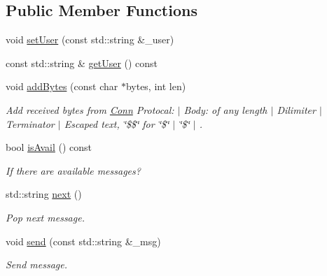 \subsection*{Public Member Functions}
\begin{DoxyCompactItemize}
\item 
void \hyperlink{classContext_a0c72699560699b43eef88c14e3e71943}{set\+User} (const std\+::string \&\+\_\+user)
\item 
const std\+::string \& \hyperlink{classContext_ad6a061c8ed4681e09c25eb830c29d93c}{get\+User} () const 
\item 
void \hyperlink{classContext_a124207fc0f8ef54550ae923503c487c9}{add\+Bytes} (const char $\ast$bytes, int len)
\begin{DoxyCompactList}\small\item\em Add received bytes from \hyperlink{classConn}{Conn} Protocal\+: $\vert$ Body\+: of any length $\vert$ Dilimiter $\vert$ Terminator $\vert$ Escaped text, \char`\"{}\$\$\char`\"{} for \char`\"{}\$\char`\"{} $\vert$ \char`\"{}\$\char`\"{} $\vert$ \textquotesingle{}. \end{DoxyCompactList}\item 
bool \hyperlink{classContext_a66a69e531a5f60da65bfd895756ebff9}{is\+Avail} () const 
\begin{DoxyCompactList}\small\item\em If there are available messages? \end{DoxyCompactList}\item 
std\+::string \hyperlink{classContext_a0e965560cf9a1aaba46e24bb908f49be}{next} ()
\begin{DoxyCompactList}\small\item\em Pop next message. \end{DoxyCompactList}\item 
void \hyperlink{classContext_a110781d4d93d9ffb762a34a021218877}{send} (const std\+::string \&\+\_\+msg)
\begin{DoxyCompactList}\small\item\em Send message. \end{DoxyCompactList}\end{DoxyCompactItemize}
